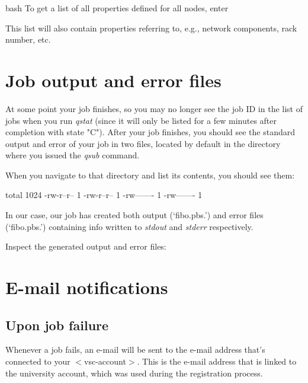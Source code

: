 \begin{code}{bash}
To get a list of all properties defined for all nodes, enter
\begin{prompt}
\end{prompt}

This list will also contain properties referring to, e.g., network components,
rack number, etc.

\section{Job output and error files}

At some point your job finishes, so you may no longer see the job ID in the
list of jobs when you run \emph{qstat} (since it will only be listed for a few
minutes after completion with state "C"). After your job finishes, you should
see the standard output and error of your job in two files, located by default
in the directory where you issued the \emph{qsub} command.


When you navigate to that directory and list its contents, you should see them:

\begin{prompt}
total 1024
-rw-r--r-- 1 %
-rw-r--r-- 1 %
-rw------- 1 %
-rw------- 1 %
\end{prompt}

In our case, our job has created both output (`fibo.pbs.\jobnumber') and
error files (`fibo.pbs.\jobnumber') containing info written to
\emph{stdout} and \emph{stderr} respectively.

Inspect the generated output and error files:

\begin{prompt}
\end{prompt}

\section{E-mail notifications}

\subsection{Upon job failure}

Whenever a job fails, an e-mail will be sent to the e-mail address that's
connected to your $<$vsc-account$>$. This is the e-mail address that is linked
to the university account, which was used during the registration process.


\end{code}
